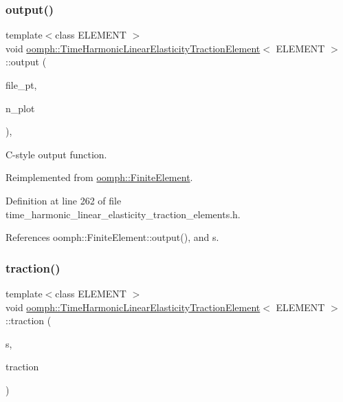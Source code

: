 \subsubsection{\texorpdfstring{output()}{output()}\hspace{0.1cm}{\footnotesize\ttfamily [4/4]}}
{\footnotesize\ttfamily template$<$class E\+L\+E\+M\+E\+NT $>$ \\
void \hyperlink{classoomph_1_1TimeHarmonicLinearElasticityTractionElement}{oomph\+::\+Time\+Harmonic\+Linear\+Elasticity\+Traction\+Element}$<$ E\+L\+E\+M\+E\+NT $>$\+::output (\begin{DoxyParamCaption}\item[{F\+I\+LE $\ast$}]{file\+\_\+pt,  }\item[{const unsigned \&}]{n\+\_\+plot }\end{DoxyParamCaption})\hspace{0.3cm}{\ttfamily [inline]}, {\ttfamily [virtual]}}



C-\/style output function. 



Reimplemented from \hyperlink{classoomph_1_1FiniteElement_adfaee690bb0608f03320eeb9d110d48c}{oomph\+::\+Finite\+Element}.



Definition at line 262 of file time\+\_\+harmonic\+\_\+linear\+\_\+elasticity\+\_\+traction\+\_\+elements.\+h.



References oomph\+::\+Finite\+Element\+::output(), and s.

\mbox{\label{classoomph_1_1TimeHarmonicLinearElasticityTractionElement_a29ba3405562f32247d4da72214637151}} 
\subsubsection{\texorpdfstring{traction()}{traction()}}
{\footnotesize\ttfamily template$<$class E\+L\+E\+M\+E\+NT $>$ \\
void \hyperlink{classoomph_1_1TimeHarmonicLinearElasticityTractionElement}{oomph\+::\+Time\+Harmonic\+Linear\+Elasticity\+Traction\+Element}$<$ E\+L\+E\+M\+E\+NT $>$\+::traction (\begin{DoxyParamCaption}\item[{const \hyperlink{classoomph_1_1Vector}{Vector}$<$ double $>$ \&}]{s,  }\item[{\hyperlink{classoomph_1_1Vector}{Vector}$<$ std\+::complex$<$ double $>$ $>$ \&}]{traction }\end{DoxyParamCaption})}



